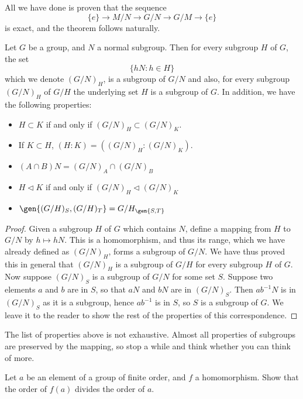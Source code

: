 All we have done is proven that the sequence
%
\[ \{e\} \xrightarrow{} M/N \xrightarrow{} G/N \xrightarrow{} G/M \xrightarrow{} \{e\} \]
%
is exact, and the theorem follows naturally.

\begin{theorem}  
Let $G$ be a group, and $N$ a normal subgroup. Then for every subgroup $H$ of $G$, the set
%
\[ \{ hN : h \in H \} \]
%
which we denote $(G/N)_H$, is a subgroup of $G/N$ and also, for every subgroup $(G/N)_H$ of $G/H$ the underlying set $H$ is a subgroup of $G$. In addition, we have the following properties:
\vspace{-3mm}
\begin{itemize}
    \item $H \subset K$ if and only if $(G/N)_H \subset (G/N)_K$.
    \item If $K \subset H$, $(H:K) = ((G/N)_H:(G/N)_K)$.
    \item $(A \cap B)N = (G/N)_A \cap (G/N)_B$
    \item $H \lhd K$ if and only if $(G/N)_H \lhd (G/N)_K$
    \item $\gen{(G/H)_S, (G/H)_T} = G/H_{\gen{S, T}}$
\end{itemize}
\end{theorem}
\begin{proof}
    Given a subgroup $H$ of $G$ which contains $N$, define a mapping from $H$ to $G/N$ by $h \mapsto hN$. This is a homomorphism, and thus its range, which we have already defined as $(G/N)_H$, forms a subgroup of $G/N$. We have thus proved this in general that $(G/N)_H$ is a subgroup of $G/H$ for every subgroup $H$ of $G$. Now suppose $(G/N)_S$ is a subgroup of $G/N$ for some set $S$. Suppose two elements $a$ and $b$ are in $S$, so that $aN$ and $bN$ are in $(G/N)_S$. Then $ab^{-1}N$ is in $(G/N)_S$ as it is a subgroup, hence $ab^{-1}$ is in $S$, so $S$ is a subgroup of $G$. We leave it to the reader to show the rest of the properties of this correspondence.
\end{proof}

The list of properties above is not exhaustive. Almost all properties of subgroups are preserved by the mapping, so stop a while and think whether you can think of more.

\clearpage

\begin{exercise}
    Let $a$ be an element of a group of finite order, and $f$ a homomorphism. Show that the order of $f(a)$ divides the order of $a$.
\end{exercise}

